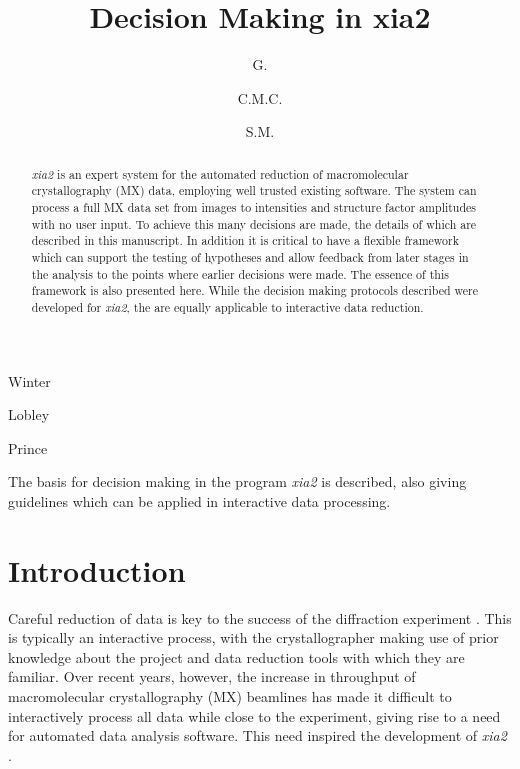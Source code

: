 \documentclass[preprint,pdf]{iucr}
\begin{document}
\title{Decision Making in xia2}

\author[a]{G.}{Winter}
\author[a]{C.M.C.}{Lobley}
\author[b]{S.M.}{Prince}


\maketitle
\clearpage

\begin{synopsis}
The basis for decision making in the program \emph{xia2} is described,
also giving guidelines which can be applied in interactive data processing.
\end{synopsis}

\begin{abstract}

\emph{xia2} is an expert system for the automated reduction of
macromolecular crystallography (MX) data, employing well trusted
existing software. The system can process a full MX data set from
images to intensities and structure factor amplitudes with no user
input. To achieve this many decisions are made, the details of which
are described in this manuscript. In addition it is critical to have a
flexible framework which can support the testing of hypotheses and
allow feedback from later stages in the analysis to the points where
earlier decisions were made. The essence of this framework is also
presented here. While the decision making protocols described were
developed for \emph{xia2}, the are equally applicable to interactive
data reduction.

\end{abstract}

\section{Introduction}

Careful reduction of data is key to the success of the diffraction
experiment \cite{Dauter:ba0020}. This is typically an interactive
process, with the crystallographer making use of prior knowledge about
the project and data reduction tools with which they are
familiar. Over recent years, however, the increase in throughput of
macromolecular crystallography (MX) beamlines has made it difficult to
interactively process all data while close to the experiment, giving
rise to a need for automated data analysis software. This need
inspired the development of \emph{xia2} \cite{Winter:ea5113}. 
\end{document}
